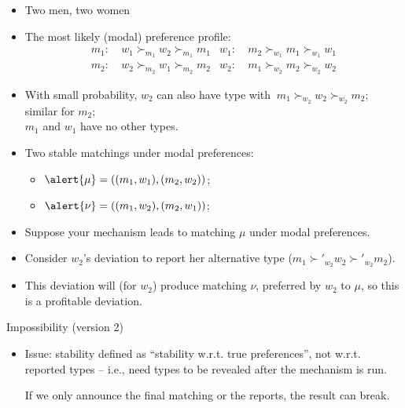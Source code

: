 \documentclass[english,10pt
,aspectratio=169
]{beamer}
\begin{document}
\begin{frame}
\begin{example}
	\begin{itemize}
		\item Two men, two women
		\item The most likely (modal) preference profile:
		{\footnotesize 
			\begin{align*}
				m_1:& \ w_1 \succ_{m_1} w_2 \succ_{m_1} m_1 	& w_1:& \ m_2 \succ_{w_1} m_1 \succ_{w_1} w_1
				\\
				m_2:& \ w_2 \succ_{m_2} w_1 \succ_{m_2} m_2 	& w_2:& \ m_1 \succ_{w_2} m_2 \succ_{w_2} w_2
			\end{align*}
		}
		\item With small probability, $w_2$ can also have type with $\ m_1 \succ_{w_2} w_2 \succ_{w_2} m_2$; similar for $m_2$; \\
		$m_1$ and $w_1$ have no other types.
		\item Two stable matchings under modal preferences: 
		\begin{itemize}
			\item $\alert{\mu} = \left( (m_1,w_1), (m_2,w_2)  \right)$;
			\item $\alert{\nu} = \left( (m_1,w_2), (m_2,w_1)  \right)$;
		\end{itemize}
		\item Suppose your mechanism leads to matching $\mu$ under modal preferences.
		\item Consider $w_2$'s deviation to report her alternative type ($m_1 \succ'_{w_2} w_2 \succ'_{w_2} m_2$).
		\item This deviation will  (for $w_2$) produce matching $\nu$, preferred by $w_2$ to $\mu$, so this is a profitable deviation.
	\end{itemize}
\end{example}
\end{frame}


\begin{frame}{Impossibility (version 2)}
\begin{itemize}
	\item \alert{Issue}: stability defined as ``stability w.r.t. true preferences'', not w.r.t. reported types -- i.e., need types to be revealed after the mechanism is run. 
	
	If we only announce the final matching or the reports, the result can break.
\end{itemize}
\end{frame}
\end{document}
